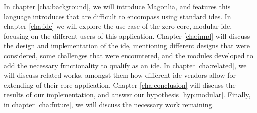In chapter \ref{cha:background}, we will introduce Magonlia, and features this
language introduces that are difficult to encompass using standard \gls*{ide}s.
In chapter \ref{cha:ide} we will explore the use case of the zero-core, modular
\gls*{ide}, focusing on the different users of this application. Chapter
\ref{cha:impl} will discuss the design and implementation of the \gls*{ide},
mentioning different designs that were considered, some challenges that were
encountered, and the modules developed to add the necessary functionality to
qualify as an \gls*{ide}. In chapter \ref{cha:related}, we will discuss related
works, amongst them how different \gls*{ide}-vendors allow for extending of
their core application. Chapter \ref{cha:conclusion} will discuss the results
of our implementation, and answer our hypothesis \ref{hyp:modular}. Finally,
in chapter \ref{cha:future}, we will discuss the necessary work remaining.
